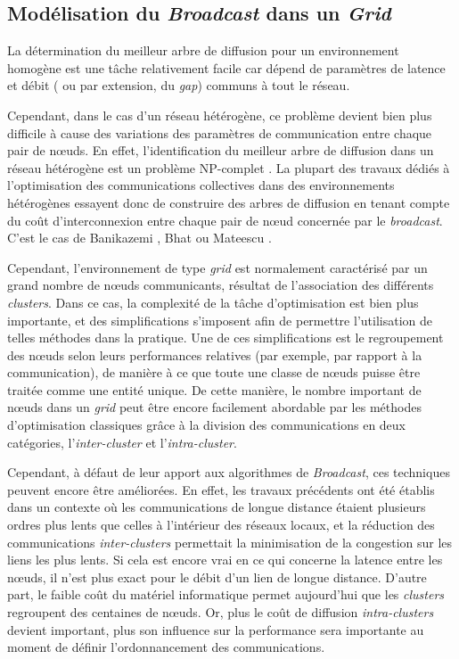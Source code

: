 \subsection{Modélisation du \textit{Broadcast} dans un \textit{Grid}}

La détermination du meilleur arbre de diffusion pour un environnement
homogène est une tâche relativement facile car dépend de paramètres de latence et débit ( ou par extension, du \textit{gap}) communs à tout le réseau.  

Cependant, dans le cas d'un réseau hétérogène, ce problème devient
bien plus difficile à cause des variations des paramètres de communication entre chaque pair de n{\oe}uds. En effet, l'identification du meilleur arbre
de diffusion dans un réseau hétérogène est un problème NP-complet \cite{Bhat99}\cite{Beaumont04c,Beaumont05b}\cite{PangfengLiu04}.
La plupart des travaux dédiés à l'optimisation des communications
collectives dans des environnements hétérogènes essayent donc de construire des arbres de diffusion en tenant compte du coût d'interconnexion entre chaque pair de n{\oe}ud concernée par le \textit{broadcast}. C'est le cas de Banikazemi \cite{Banikazemi98},
Bhat \cite{Bhat99,Bhat03} ou Mateescu \cite{Mateescu05}.

Cependant, l'environnement de type \textit{grid} est normalement caractérisé
par un grand nombre de n{\oe}uds communicants, résultat de l'association
des différents \textit{clusters}. Dans ce cas, la complexité de la
tâche d'optimisation est bien plus importante, et des simplifications
s'imposent afin de permettre l'utilisation de telles méthodes dans
la pratique. Une de ces simplifications est le regroupement des n{\oe}uds
selon leurs performances relatives (par exemple, par rapport à la
communication), de manière à ce que toute une classe de n{\oe}uds
puisse être traitée comme une entité unique. De cette manière, le nombre important de n{\oe}uds dans un \textit{grid} peut être
encore facilement abordable par les méthodes d'optimisation classiques grâce à la division des communications en deux catégories, l'\textit{inter-cluster} et l'\textit{intra-cluster}. 


Cependant, à défaut de leur apport aux algorithmes de \textit{Broadcast}, ces
techniques peuvent encore être améliorées. En effet, les travaux précédents
ont été établis dans un contexte où les communications de longue distance
étaient plusieurs ordres plus lents que celles à l'intérieur des
réseaux locaux, et la réduction des communications \textit{inter-clusters} permettait
la minimisation de la congestion sur les liens les plus lents. Si
cela est encore vrai en ce qui concerne la latence entre les n{\oe}uds,
il n'est plus exact pour le débit d'un lien de longue distance. D'autre
part, le faible coût du matériel informatique permet aujourd'hui que
les  \textit{clusters} regroupent des centaines de n{\oe}uds. Or, plus le coût de
diffusion \textit{intra-clusters} devient important, plus son influence
sur la performance sera importante au moment de définir l'ordonnancement
des communications.

